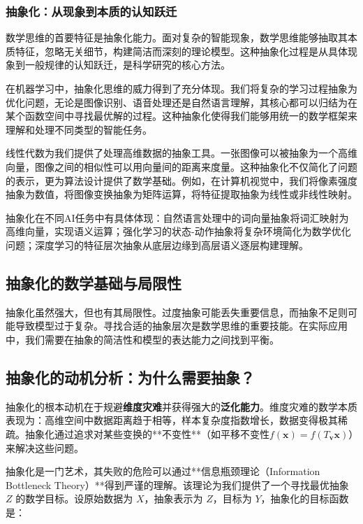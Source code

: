 \subsubsection{抽象化：从现象到本质的认知跃迁}

数学思维的首要特征是抽象化能力。面对复杂的智能现象，数学思维能够抽取其本质特征，忽略无关细节，构建简洁而深刻的理论模型。这种抽象化过程是从具体现象到一般规律的认知跃迁，是科学研究的核心方法。

在机器学习中，抽象化思维的威力得到了充分体现。我们将复杂的学习过程抽象为优化问题，无论是图像识别、语音处理还是自然语言理解，其核心都可以归结为在某个函数空间中寻找最优解的过程。这种抽象化使得我们能够用统一的数学框架来理解和处理不同类型的智能任务。

线性代数为我们提供了处理高维数据的抽象工具。一张图像可以被抽象为一个高维向量，图像之间的相似性可以用向量间的距离来度量。这种抽象化不仅简化了问题的表示，更为算法设计提供了数学基础。例如，在计算机视觉中，我们将像素强度抽象为数值，将图像变换抽象为矩阵运算，将特征提取抽象为线性或非线性映射。

抽象化在不同AI任务中有具体体现：自然语言处理中的词向量抽象将词汇映射为高维向量，实现语义运算；强化学习的状态-动作抽象将复杂环境简化为数学优化问题；深度学习的特征层次抽象从底层边缘到高层语义逐层构建理解。

\subsection*{抽象化的数学基础与局限性}

抽象化虽然强大，但也有其局限性。过度抽象可能丢失重要信息，而抽象不足则可能导致模型过于复杂。寻找合适的抽象层次是数学思维的重要技能。在实际应用中，我们需要在抽象的简洁性和模型的表达能力之间找到平衡。

\subsection*{抽象化的动机分析：为什么需要抽象？}

抽象化的根本动机在于规避\textbf{维度灾难}并获得强大的\textbf{泛化能力}。维度灾难的数学本质表现为：高维空间中数据距离趋于相等，样本复杂度指数增长，数据变得极其稀疏。抽象化通过追求对某些变换的**不变性**（如平移不变性$f(\mathbf{x}) = f(T_{\mathbf{v}}\mathbf{x})$）来解决这些问题。

抽象化是一门艺术，其失败的危险可以通过**信息瓶颈理论（Information Bottleneck Theory）**得到严谨的理解。该理论为我们提供了一个寻找最优抽象 $Z$ 的数学目标。设原始数据为 $X$，抽象表示为 $Z$，目标为 $Y$，抽象化的目标函数是：

